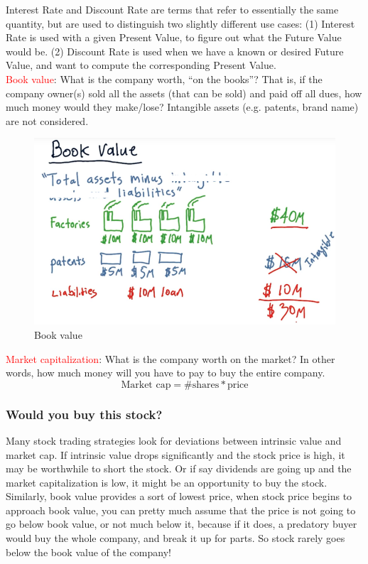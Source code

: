 \documentclass[12pt]{article}
\newcommand{\q}[1]{``#1''}
\begin{document}
Interest Rate and Discount Rate are terms that refer to essentially the same quantity, but are used to distinguish two slightly different use cases: (1) Interest Rate is used with a given Present Value, to figure out what the Future Value would be. (2) Discount Rate is used when we have a known or desired Future Value, and want to compute the corresponding Present Value.\\[8pt]
\noindent
\textcolor{red}{Book value}: What is the company worth, \q{on the books}? That is, if the company owner(s) sold all the assets (that can be sold) and paid off all dues, how much money would they make/lose? Intangible assets (e.g. patents, brand name) are not considered. \\[8pt]
\begin{figure}[!ht]
\centering
\includegraphics[scale=0.4]{fig/fig36}
\caption{Book value}
\end{figure}
\textcolor{red}{Market capitalization}: What is the company worth on the market? In other words, how much money will you have to pay to buy the entire company.
\begin{equation}
\text{Market cap} = \text{\# shares} * \text{price} \nonumber
\end{equation}

\subsubsection{Would you buy this stock?}

Many stock trading strategies look for deviations between intrinsic value and market cap. If intrinsic value drops significantly and the stock price is high, it may be worthwhile to short the stock. Or if say dividends are going up and the market capitalization is low, it might be an opportunity to buy the stock. Similarly, book value provides a sort of lowest price, when stock price begins to approach book value, you can pretty much assume that the price is not going to go below book value, or not much below it, because if it does, a predatory buyer would buy the whole company, and break it up for parts. So stock rarely goes below the book value of the company!
\end{document}

